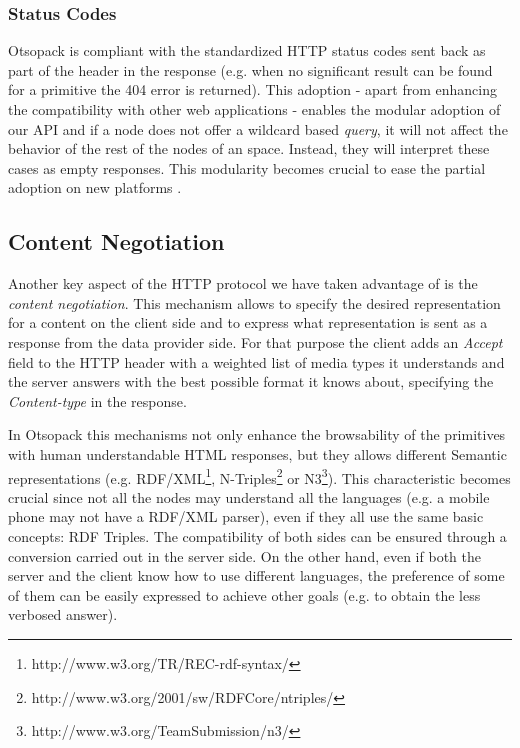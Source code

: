 \subsubsection{Status Codes}
Otsopack is compliant with the standardized HTTP status codes sent back as part of the header in the response (e.g. when no significant result can be found for a primitive the 404 error is returned).
This adoption - apart from enhancing the compatibility with other web applications - enables the modular adoption of our API and if a node does not offer a wildcard based \textit{query}, it will not affect the behavior of the rest of the nodes of an space.
Instead, they will interpret these cases as empty responses.
This modularity becomes crucial to ease the partial adoption on new platforms \citep{gomez-goiri_collaboration_2011}.

\subsection{Content Negotiation}
Another key aspect of the HTTP protocol we have taken advantage of is the \textit{content negotiation}.
This mechanism allows to specify the desired representation for a content on the client side and to express what representation is sent as a response from the data provider side.
For that purpose the client adds an \textit{Accept} field to the HTTP header with a weighted list of media types it understands and the server answers with the best possible format it knows about, specifying the \textit{Content-type} in the response.

In Otsopack this mechanisms not only enhance the browsability of the primitives with human understandable HTML responses, but they allows different Semantic representations (e.g. RDF/XML\footnote{http://www.w3.org/TR/REC-rdf-syntax/}, N-Triples\footnote{http://www.w3.org/2001/sw/RDFCore/ntriples/} or N3\footnote{http://www.w3.org/TeamSubmission/n3/}).
This characteristic becomes crucial since not all the nodes may understand all the languages (e.g. a mobile phone may not have a RDF/XML parser), even if they all use the same basic concepts: RDF Triples.
The compatibility of both sides can be ensured through a conversion carried out in the server side.
On the other hand, even if both the server and the client know how to use different languages, the preference of some of them can be easily expressed to achieve other goals (e.g. to obtain the less verbosed answer).
